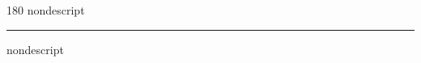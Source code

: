 
\begin{frame}
\begin{center}
\begin{turn}{180}
{\fontsize{2.5cm}{1em}\selectfont nondescript}
\end{turn}
\vspace{1em}\par  
\hrule
\vspace{1em}\par  
{\fontsize{2.5cm}{1em}\selectfont nondescript}
\end{center}
\end{frame}
